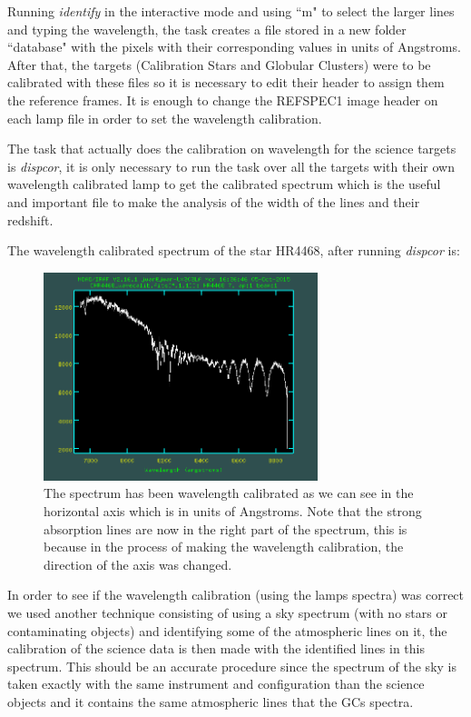 Running \textit{identify} in the interactive mode and using ``m" to select the larger lines and typing the wavelength, the task creates a file stored in a new folder ``database" with the pixels with their corresponding values in units of Angstroms. After that, the targets (Calibration Stars and Globular Clusters) were to be calibrated with these files so it is necessary to edit their header to assign them the reference frames. It is enough to change the REFSPEC1 image header on each lamp file in order to set the wavelength calibration. 

The task that actually does the calibration on wavelength for the science targets is \textit{dispcor}, it is only necessary to run the task over all the targets with their own wavelength calibrated lamp to get the calibrated spectrum which is the useful and important file to make the analysis of the width of the lines and their redshift.

The wavelength calibrated spectrum of the star HR4468, after running \textit{dispcor} is:

\begin{figure}[H]
\centering
\includegraphics[width=8cm]{images/calib_star_wave.png}
\caption[Wavelength calibrated spectrum of HR4468]{The spectrum has been wavelength calibrated as we can see in the horizontal axis which is in units of Angstroms. Note that the strong absorption lines are now in the right part of the spectrum, this is because in the process of making the wavelength calibration, the direction of the axis was changed.}
\end{figure}

In order to see if the wavelength calibration (using the lamps spectra) was correct we used another technique consisting of using a sky spectrum (with no stars or contaminating objects) and identifying some of the atmospheric lines on it, the calibration of the science data is then made with the identified lines in this spectrum. This should be an accurate procedure since the spectrum of the sky is taken exactly with the same instrument and configuration than the science objects and it contains the same atmospheric lines that the GCs spectra. 

